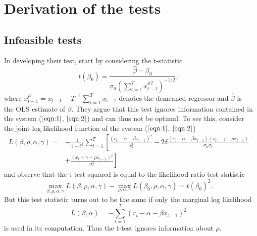 \documentclass{article}
\begin{document}
\section{Derivation of the tests}
\label{Derivation of the tests}
\subsection{Infeasible tests}
\label{Infeasible tests}
In developing their test, \citet{campbell2006efficient} start by considering the t-statistic 
\begin{equation}
t\left(\beta_{0}\right)=\frac{\widehat{\beta}-\beta_{0}}{\sigma_{u}\left(\sum_{t=1}^{T} x_{t-1}^{\mu 2}\right)^{-1 / 2}},
\end{equation}
where $x_{t-1}^{\mu}=x_{t-1}-T^{-1} \sum_{t=1}^{T} x_{t-1}$ denotes the demeaned regressor and $\widehat{\beta}$ is the OLS estimate of $\beta$. They argue that this test ignores information contained in the system ($\ref{eqn:1}$, $\ref{eqn:2}$) and can thus not be optimal. To see this, consider the joint log likelihood function of the system ($\ref{eqn:1}$, $\ref{eqn:2}$)
\begin{equation}
\begin{aligned} L(\beta, \rho, \alpha, \gamma)=&-\frac{1}{1-\delta^{2}} \sum_{t=1}^{T}\left[\frac{\left(r_{t}-\alpha-\beta x_{t-1}\right)^{2}}{\sigma_{u}^{2}}-2 \delta \frac{\left(r_{t}-\alpha-\beta x_{t-1}\right)\left(x_{t}-\gamma-\rho x_{t-1}\right)}{\sigma_{u} \sigma_{e}}\right.\\ &\left.+\frac{\left(x_{t}-\gamma-\rho x_{t-1}\right)^{2}}{\sigma_{e}^{2}}\right] \end{aligned}
\end{equation}
and observe that the t-test squared is equal to the likelihood ratio test statistic
\begin{equation}
\max _{\beta, \rho, \alpha, \gamma} L(\beta, \rho, \alpha, \gamma)-\max _{\rho, \alpha, \gamma} L\left(\beta_{0}, \rho, \alpha, \gamma\right)=t\left(\beta_{0}\right)^{2}.
\end{equation}
But this test statistic turns out to be the same if only the marginal log likelihood 
\begin{equation}
L(\beta, \alpha)=-\sum_{t=1}^{T}\left(r_{t}-\alpha-\beta x_{t-1}\right)^{2}
\end{equation}
is used in its computation. Thus the t-test ignores information about $\rho$.
\end{document}

